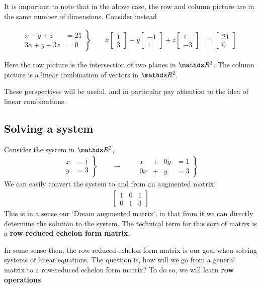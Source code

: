 \documentclass[11pt]{article}
\newcommand{\keyphrase}{\textbf}
\begin{document}
It is important to note that in the above case, the row and column picture are in the same number of dimensions. Consider instead

\begin{align*}
\left.
\begin{aligned}
x - y + z &= 21
\\
3x + y - 3z &= 0
\end{aligned}
\right\}
&&
\begin{aligned}
x \begin{bmatrix}1\\3\end{bmatrix}
+
y \begin{bmatrix} -1\\1\end{bmatrix}
+
z \begin{bmatrix} 1\\-3\end{bmatrix}
&=
\begin{bmatrix}21\\0\end{bmatrix}
\end{aligned}
\end{align*}

Here the row picture is the intersection of two planes in $\bbR^3$. The column picture is a linear combination of vectors in $\bbR^2$.

These perspectives will be useful, and in particular pay attention to the idea of linear combinations.

\subsection*{Solving a system}
Consider the system in $\bbR^2$,
\begin{align*}
\left.
\begin{aligned}
x &= 1
\\
y &= 3
\end{aligned}
\right\}
\qquad
\longrightarrow
\qquad
\left.
\begin{matrix}
x & + & 0y & = 1
\\
0x & + & y & = 3
\end{matrix}
\right\}
\end{align*}
We can easily convert the system to and from an augmented matrix:
\begin{align*}
\left[
\begin{matrix}
1 & 0 & 1
\\
0 & 1 & 3
\end{matrix}
\right]
\end{align*}
This is in a sense our `Dream augmented matrix', in that from it we can directly determine the solution to the system. The technical term for this sort of matrix is a \keyphrase{row-reduced echelon form matrix}.

In some sense then, the row-reduced echelon form matrix is our goal when solving systems of linear equations. The question is, how will we go from a general matrix to a row-reduced echelon form matrix? To do so, we will learn \keyphrase{row operations} 
\end{document}
